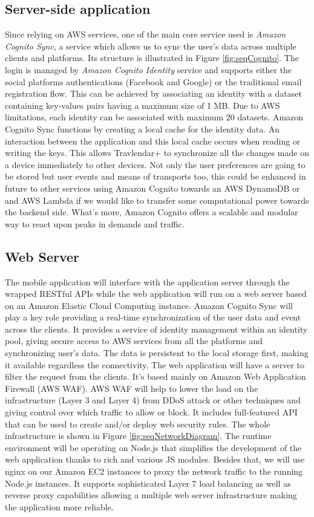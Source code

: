 \subsection*{Server-side application}
Since relying on AWS services, one of the main core service used is \textit{Amazon Cognito Sync}, a service which allows us to sync the user's data across multiple clients and platforms. Its structure is illustrated in Figure \ref{fig:seqCognito}.
The login is managed by \textit{Amazon Cognito Identity} service and supports either the social platforms authentications (Facebook and Google) or the traditional email registration flow. This can be achieved by associating an identity with a dataset containing key-values pairs having a maximum size of 1 MB. Due to AWS limitations, each identity can be associated with maximum 20 datasets.
Amazon Cognito Sync functions by creating a local cache for the identity data. An interaction between the application and this local cache occurs when reading or writing the keys. 
This allows Travlendar+ to synchronize all the changes made on a device immediately to other devices.
Not only the user preferences are going to be stored but user events and means of transports too, this could be enhanced in future to other services using Amazon Cognito towards an AWS DynamoDB or and AWS Lambda if we would like to transfer some computational power towards the backend side. What's more, Amazon Cognito offers a scalable and modular way to react upon peaks in demands and traffic.

\subsection*{Web Server}
The mobile application will interface with the application server through the wrapped RESTful APIs while the web application will run on a web server based on an Amazon Elastic Cloud Computing instance.
Amazon Cognito Sync will play a key role providing a real-time synchronization of the user data and event across the clients.
It provides a service of identity management within an identity pool, giving secure access to AWS services from all the platforms and synchronizing user's data. 
The data is persistent to the local storage first, making it available regardless the connectivity. The web application will have a server to filter the request from the clients. 
It's based mainly on Amazon Web Application Firewall (AWS WAF).
AWS WAF will help to lower the load on the infrastructure (Layer 3 and Layer 4) from DDoS attack or other techniques and giving control over which traffic to allow or block. It includes full-featured API that can be used to create and/or deploy web security rules. The whole infrastructure is shown in Figure \ref{fig:seqNetworkDiagram}.
The runtime environment will be operating on Node.js that simplifies the development of the web application thanks to rich and various JS modules. Besides that, we will use nginx on our Amazon EC2 instances to proxy the network traffic to the running Node.js instances. It supports sophisticated Layer 7 load balancing as well as reverse proxy capabilities allowing a multiple web server infrastructure making the application more reliable.

